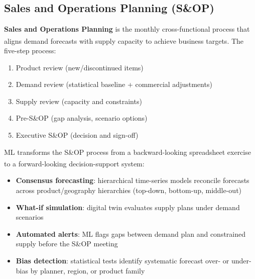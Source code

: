 \subsection{Sales and Operations Planning (S\&OP)}

\begin{tcbitemize}[ skin=sectionraster ]

    \tcbitem[title=The S\&OP Process, raster multicolumn=3]
    \textbf{Sales and Operations Planning} is the monthly cross-functional process that aligns demand forecasts with supply capacity to achieve business targets\textsuperscript{\cite[][pp.~188--196]{chopraSupplyChainManagement2019}}.
    The five-step process:
    \begin{enumerate}
        \item Product review (new/discontinued items)
        \item Demand review (statistical baseline + commercial adjustments)
        \item Supply review (capacity and constraints)
        \item Pre-S\&OP (gap analysis, scenario options)
        \item Executive S\&OP (decision and sign-off)
    \end{enumerate}

    \tcbitem[title=AI in S\&OP, raster multicolumn=3]
    ML transforms the S\&OP process from a backward-looking spreadsheet exercise to a forward-looking decision-support system\textsuperscript{\cite[][pp.~196--201]{chopraSupplyChainManagement2019}}:
    \begin{itemize}
        \item \textbf{Consensus forecasting}: hierarchical time-series models reconcile forecasts across product/geography hierarchies (top-down, bottom-up, middle-out)
        \item \textbf{What-if simulation}: digital twin evaluates supply plans under demand scenarios
        \item \textbf{Automated alerts}: ML flags gaps between demand plan and constrained supply before the S\&OP meeting
        \item \textbf{Bias detection}: statistical tests identify systematic forecast over- or under-bias by planner, region, or product family
    \end{itemize}

\end{tcbitemize}

